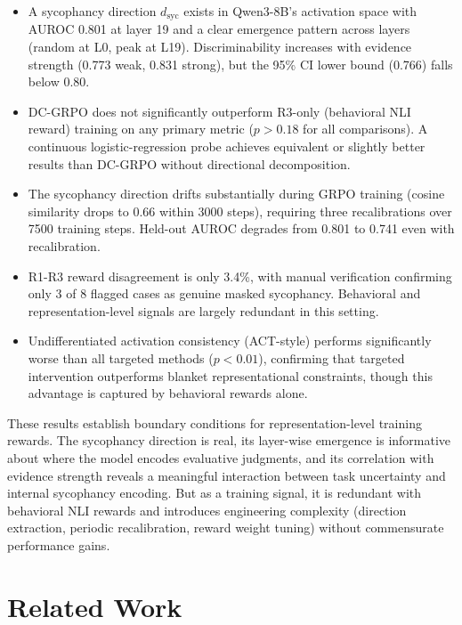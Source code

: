 \documentclass[11pt,a4paper]{article}
\newcommand{\dsyc}{$d_{\text{syc}}$}
\begin{document}
\begin{itemize}
    \item A sycophancy direction \dsyc{} exists in Qwen3-8B's activation space with AUROC 0.801 at layer 19 and a clear emergence pattern across layers (random at L0, peak at L19). Discriminability increases with evidence strength (0.773 weak, 0.831 strong), but the 95\% CI lower bound (0.766) falls below 0.80.
    \item DC-GRPO does not significantly outperform R3-only (behavioral NLI reward) training on any primary metric ($p > 0.18$ for all comparisons). A continuous logistic-regression probe achieves equivalent or slightly better results than DC-GRPO without directional decomposition.
    \item The sycophancy direction drifts substantially during GRPO training (cosine similarity drops to 0.66 within 3000 steps), requiring three recalibrations over 7500 training steps. Held-out AUROC degrades from 0.801 to 0.741 even with recalibration.
    \item R1-R3 reward disagreement is only 3.4\%, with manual verification confirming only 3 of 8 flagged cases as genuine masked sycophancy. Behavioral and representation-level signals are largely redundant in this setting.
    \item Undifferentiated activation consistency (ACT-style) performs significantly worse than all targeted methods ($p < 0.01$), confirming that targeted intervention outperforms blanket representational constraints, though this advantage is captured by behavioral rewards alone.
\end{itemize}

These results establish boundary conditions for representation-level training rewards. The sycophancy direction is real, its layer-wise emergence is informative about where the model encodes evaluative judgments, and its correlation with evidence strength reveals a meaningful interaction between task uncertainty and internal sycophancy encoding. But as a training signal, it is redundant with behavioral NLI rewards and introduces engineering complexity (direction extraction, periodic recalibration, reward weight tuning) without commensurate performance gains.

\section{Related Work}
\end{document}

